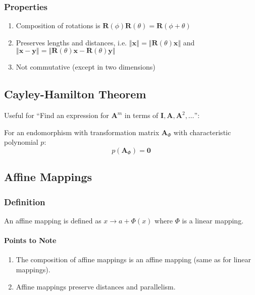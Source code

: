 \documentclass[10pt,twoside,twocolumn]{article}
\begin{document}
\subsubsection{Properties}
\begin{enumerate}
\item Composition of rotations is $\mathbf{R}\left(\phi\right)\mathbf{R}\left(\theta\right)=\mathbf{R}\left(\phi+\theta\right)$ 
\item Preserves lengths and distances, i.e. $\left\Vert \mathbf{x}\right\Vert =\left\Vert \mathbf{R}\left(\theta\right)\mathbf{x}\right\Vert $
and $\left\Vert \mathbf{x}-\mathbf{y}\right\Vert =\left\Vert \mathbf{R}\left(\theta\right)\mathbf{x}-\mathbf{R}\left(\theta\right)\mathbf{y}\right\Vert $ 
\item Not commutative (except in two dimensions) 
\end{enumerate}

\subsection{Cayley-Hamilton Theorem}

Useful for ``Find an expression for $\mathbf{A}^{m}$ in terms of
$\mathbf{I},\mathbf{A},\mathbf{A}^{2},\dots$'':

For an endomorphism with transformation matrix $\mathbf{A}_{\Phi}$
with characteristic polynomial $p$: 
\[
p\left(\mathbf{A}_{\Phi}\right)=\mathbf{0}
\]



\subsection{Affine Mappings}


\subsubsection{Definition}

An affine mapping is defined as $x\rightarrow a+\Phi\left(x\right)$
where $\Phi$ is a linear mapping.


\paragraph{Points to Note}
\begin{enumerate}
\item The composition of affine mappings is an affine mapping (same as for
linear mappings). 
\item Affine mappings preserve distances and parallelism. 
\end{enumerate}
\end{document}
